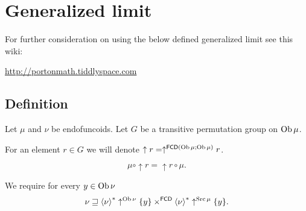\section{Generalized limit}

For further consideration on using the below defined generalized limit
see this wiki:

\href{http://portonmath.tiddlyspace.com}{http://portonmath.tiddlyspace.com}


\subsection{Definition}

Let $\mu$ and $\nu$ be endofuncoids. Let $G$ be a transitive permutation
group on $\operatorname{Ob}\mu$.

For an element $r\in G$ we will denote $\uparrow r=\uparrow^{\mathsf{FCD}(\operatorname{Ob}\mu;\operatorname{Ob}\mu)}r$.

\[
\mu\circ\uparrow r=\uparrow r\circ\mu.
\]


We require for every $y\in\operatorname{Ob}\nu$ 
\begin{equation}
\nu\sqsupseteq\left\langle \nu\right\rangle ^{\ast}\uparrow^{\operatorname{Ob}\nu}\{y\}\times^{\mathsf{FCD}}\left\langle \nu\right\rangle ^{\ast}\uparrow^{\operatorname{Src}\mu}\{y\}.\label{lim-squares}
\end{equation}

